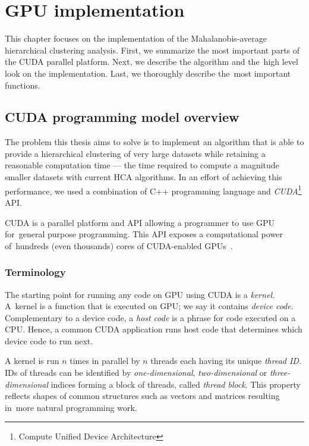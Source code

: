\chapter{GPU implementation}

This chapter focuses on the implementation of the Mahalanobis-average hierarchical clustering analysis. First, we summarize the most important parts of the CUDA parallel platform. Next, we describe the algorithm and the~high level look on the implementation. Last, we thoroughly describe the~most important functions.

\section{CUDA programming model overview}
\label{sec02:cuda}

The problem this thesis aims to solve is to implement an algorithm that is able to provide a hierarchical clustering of very large datasets while retaining a reasonable computation time --- the time required to compute a magnitude smaller datasets with current HCA algorithms.
In an effort of achieving this performance, we used a combination of C++ programming language and \emph{CUDA}\footnote{Compute Unified Device Architecture} API.

CUDA is a parallel platform and API allowing a programmer to use GPU for~general purpose programming. This API exposes a computational power of~hundreds (even thousands) cores of CUDA-enabled GPUs~\cite{cuda}.


\subsection{Terminology}

The starting point for running any code on GPU using CUDA is a \emph{kernel}. A~kernel is a function that is executed on GPU; we say it contains \emph{device code}. Complementary to a device code, a \emph{host code} is a phrase for code executed on a CPU. Hence, a common CUDA application runs host code that determines which device code to run next. 

A kernel is run $n$ times in parallel by $n$ threads each having its unique \emph{thread ID}. IDs of threads can be identified by \emph{one-dimensional}, \emph{two-dimensional} or \emph{three-dimensional} indices forming a block of threads, called \emph{thread block}. This property reflects shapes of common structures such as vectors and matrices resulting in~more natural programming work.

